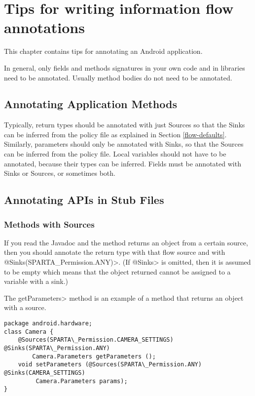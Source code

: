 \htmlhr
\chapter{Tips for writing information flow annotations\label{app-annotation}}

This chapter contains tips for annotating an Android application.

In general, only fields and methods signatures in your own code and in
libraries need to be annotated. Usually method bodies do not need to be
annotated.


\section{Annotating Application Methods\label{sec:annomethods}}

Typically, return types should be annotated with just Sources so that the Sinks can be
 inferred from the policy file as explained in Section \ref{flow-defaults}. Similarly, parameters should
  only be annotated with Sinks, so that the Sources can be inferred from  the policy file.
    Local variables should not have to be annotated, because their types can be inferred. Fields 
    must be annotated with  Sinks or Sources, or sometimes both. 

\section{Annotating APIs in Stub Files\label{sec:annoAPI}}

\subsection{Methods with Sources}
If you read the Javadoc and the method returns an object from a certain source, then you should annotate
the return type with that flow source and with \<@Sinks(SPARTA\_Permission.ANY)>.  (If \<@Sinks> is omitted, then it is assumed to be empty
 which means that the object returned cannot be assigned to a variable with a sink.)

The \<getParameters> method is an example of a method that returns an object with a source.
\begin{Verbatim}
package android.hardware;
class Camera {
    @Sources(SPARTA\_Permission.CAMERA_SETTINGS) @Sinks(SPARTA\_Permission.ANY)
        Camera.Parameters getParameters ();
    void setParameters (@Sources(SPARTA\_Permission.ANY) @Sinks(CAMERA_SETTINGS) 
         Camera.Parameters params);
}
\end{Verbatim}



